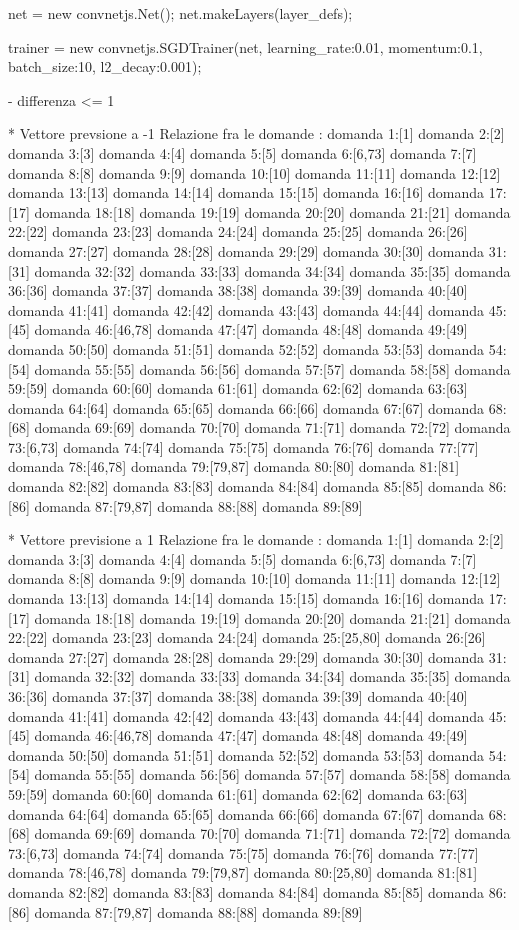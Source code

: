 net = new convnetjs.Net();
net.makeLayers(layer_defs);

trainer = new convnetjs.SGDTrainer(net, {learning_rate:0.01, momentum:0.1, batch_size:10, l2_decay:0.001});

- differenza <= 1

* Vettore prevsione a -1
Relazione fra le domande :
domanda 1:[1]
domanda 2:[2]
domanda 3:[3]
domanda 4:[4]
domanda 5:[5]
domanda 6:[6,73]
domanda 7:[7]
domanda 8:[8]
domanda 9:[9]
domanda 10:[10]
domanda 11:[11]
domanda 12:[12]
domanda 13:[13]
domanda 14:[14]
domanda 15:[15]
domanda 16:[16]
domanda 17:[17]
domanda 18:[18]
domanda 19:[19]
domanda 20:[20]
domanda 21:[21]
domanda 22:[22]
domanda 23:[23]
domanda 24:[24]
domanda 25:[25]
domanda 26:[26]
domanda 27:[27]
domanda 28:[28]
domanda 29:[29]
domanda 30:[30]
domanda 31:[31]
domanda 32:[32]
domanda 33:[33]
domanda 34:[34]
domanda 35:[35]
domanda 36:[36]
domanda 37:[37]
domanda 38:[38]
domanda 39:[39]
domanda 40:[40]
domanda 41:[41]
domanda 42:[42]
domanda 43:[43]
domanda 44:[44]
domanda 45:[45]
domanda 46:[46,78]
domanda 47:[47]
domanda 48:[48]
domanda 49:[49]
domanda 50:[50]
domanda 51:[51]
domanda 52:[52]
domanda 53:[53]
domanda 54:[54]
domanda 55:[55]
domanda 56:[56]
domanda 57:[57]
domanda 58:[58]
domanda 59:[59]
domanda 60:[60]
domanda 61:[61]
domanda 62:[62]
domanda 63:[63]
domanda 64:[64]
domanda 65:[65]
domanda 66:[66]
domanda 67:[67]
domanda 68:[68]
domanda 69:[69]
domanda 70:[70]
domanda 71:[71]
domanda 72:[72]
domanda 73:[6,73]
domanda 74:[74]
domanda 75:[75]
domanda 76:[76]
domanda 77:[77]
domanda 78:[46,78]
domanda 79:[79,87]
domanda 80:[80]
domanda 81:[81]
domanda 82:[82]
domanda 83:[83]
domanda 84:[84]
domanda 85:[85]
domanda 86:[86]
domanda 87:[79,87]
domanda 88:[88]
domanda 89:[89]


* Vettore previsione a 1
Relazione fra le domande :
domanda 1:[1]
domanda 2:[2]
domanda 3:[3]
domanda 4:[4]
domanda 5:[5]
domanda 6:[6,73]
domanda 7:[7]
domanda 8:[8]
domanda 9:[9]
domanda 10:[10]
domanda 11:[11]
domanda 12:[12]
domanda 13:[13]
domanda 14:[14]
domanda 15:[15]
domanda 16:[16]
domanda 17:[17]
domanda 18:[18]
domanda 19:[19]
domanda 20:[20]
domanda 21:[21]
domanda 22:[22]
domanda 23:[23]
domanda 24:[24]
domanda 25:[25,80]
domanda 26:[26]
domanda 27:[27]
domanda 28:[28]
domanda 29:[29]
domanda 30:[30]
domanda 31:[31]
domanda 32:[32]
domanda 33:[33]
domanda 34:[34]
domanda 35:[35]
domanda 36:[36]
domanda 37:[37]
domanda 38:[38]
domanda 39:[39]
domanda 40:[40]
domanda 41:[41]
domanda 42:[42]
domanda 43:[43]
domanda 44:[44]
domanda 45:[45]
domanda 46:[46,78]
domanda 47:[47]
domanda 48:[48]
domanda 49:[49]
domanda 50:[50]
domanda 51:[51]
domanda 52:[52]
domanda 53:[53]
domanda 54:[54]
domanda 55:[55]
domanda 56:[56]
domanda 57:[57]
domanda 58:[58]
domanda 59:[59]
domanda 60:[60]
domanda 61:[61]
domanda 62:[62]
domanda 63:[63]
domanda 64:[64]
domanda 65:[65]
domanda 66:[66]
domanda 67:[67]
domanda 68:[68]
domanda 69:[69]
domanda 70:[70]
domanda 71:[71]
domanda 72:[72]
domanda 73:[6,73]
domanda 74:[74]
domanda 75:[75]
domanda 76:[76]
domanda 77:[77]
domanda 78:[46,78]
domanda 79:[79,87]
domanda 80:[25,80]
domanda 81:[81]
domanda 82:[82]
domanda 83:[83]
domanda 84:[84]
domanda 85:[85]
domanda 86:[86]
domanda 87:[79,87]
domanda 88:[88]
domanda 89:[89]


